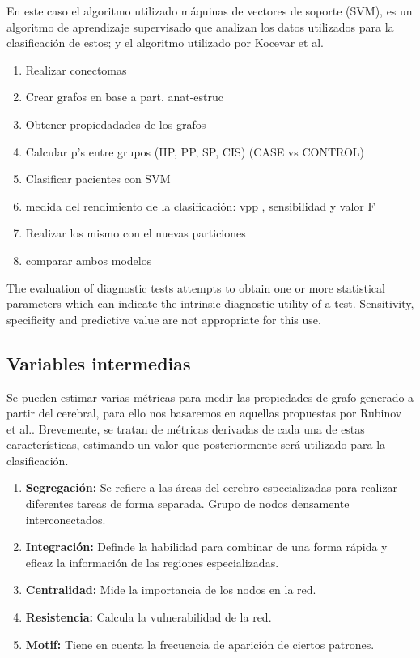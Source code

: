 \documentclass[fleqn,10pt]{UICArticle} %
\begin{document}
En este caso el algoritmo utilizado máquinas de vectores de soporte (SVM), es un algoritmo de aprendizaje supervisado que analizan los datos utilizados para la clasificación de estos; y el algoritmo utilizado por Kocevar et al.\cite{Kocevar2016}


\begin{enumerate}[noitemsep]
\item Realizar conectomas
\item Crear grafos en base a part. anat-estruc
\item Obtener propiedadades de los grafos
\item Calcular p's entre grupos (HP, PP, SP, CIS) (CASE vs CONTROL) %
\item Clasificar pacientes con SVM
\item medida del rendimiento de la clasificación: vpp , sensibilidad y valor F
\item Realizar los mismo con el nuevas particiones
\item comparar ambos modelos
\end{enumerate}


The evaluation of diagnostic tests attempts to obtain one or more statistical parameters which can indicate the intrinsic diagnostic utility of a test. Sensitivity, specificity and predictive value are not appropriate for this use\cite{Birkett1988}.


\subsection{Variables intermedias}
Se pueden estimar varias métricas para medir las propiedades de grafo generado a partir del cerebral, para ello nos basaremos en aquellas propuestas por Rubinov et al.\cite{Rubinov2010}. Brevemente, se tratan de métricas derivadas de cada una de estas características, estimando un valor que posteriormente será utilizado para la clasificación.

\begin{enumerate}[noitemsep]
\item \textbf{Segregación:} Se refiere a las áreas del cerebro especializadas para realizar diferentes tareas de forma separada. Grupo de nodos densamente interconectados.
\item \textbf{Integración:} Definde la habilidad para combinar de una forma rápida y eficaz la información de las regiones especializadas.
\item \textbf{Centralidad:} Mide la importancia de los nodos en la red.
\item \textbf{Resistencia:} Calcula la vulnerabilidad de la red.
\item \textbf{Motif:} Tiene en cuenta la frecuencia de aparición de ciertos patrones.
\end{enumerate}
\end{document}

